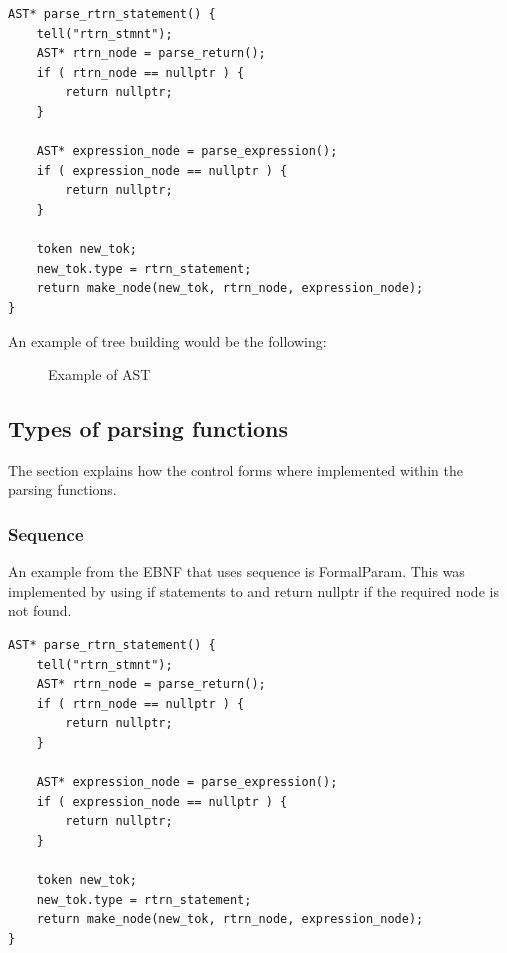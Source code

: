 \documentclass[a4paper, 12pt]{article}
\begin{document}
\begin{lstlisting}[caption="The change to return node pointer"]
AST* parse_rtrn_statement() {
    tell("rtrn_stmnt");
    AST* rtrn_node = parse_return();
    if ( rtrn_node == nullptr ) {
        return nullptr;
    }

    AST* expression_node = parse_expression();
    if ( expression_node == nullptr ) {
        return nullptr;
    }

    token new_tok;
    new_tok.type = rtrn_statement;
    return make_node(new_tok, rtrn_node, expression_node);
}
\end{lstlisting}

An example of tree building would be the following:
\begin{figure}[h]
    \centering
    \caption{Example of AST}
\end{figure}

\subsection{Types of parsing functions}
The section explains how the control forms where implemented within the parsing functions.

\subsubsection{Sequence}
An example from the EBNF that uses sequence is FormalParam. This was implemented by using if statements to and return 
nullptr if the required node is not found.

\begin{lstlisting}[caption="Sequence example"]
AST* parse_rtrn_statement() {
    tell("rtrn_stmnt");
    AST* rtrn_node = parse_return();
    if ( rtrn_node == nullptr ) {
        return nullptr;
    }

    AST* expression_node = parse_expression();
    if ( expression_node == nullptr ) {
        return nullptr;
    }

    token new_tok;
    new_tok.type = rtrn_statement;
    return make_node(new_tok, rtrn_node, expression_node);
}
\end{lstlisting}
\end{document}
